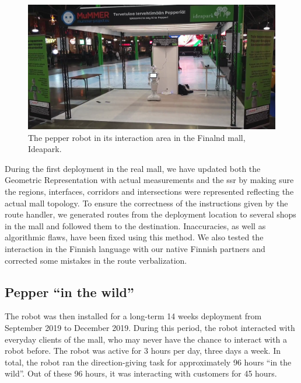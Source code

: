 \begin{figure}[ht!]
\centering
\includegraphics[scale=0.2]{figures/chapter8/pepper_mall.png}
\caption{\label{fig:chap8_pepper_mall} The pepper robot in its interaction area in the Finalnd mall, Ideapark. }
\end{figure}

During the first deployment in the real mall, we have updated both the Geometric Representation with actual measurements and the \acrfull{ssr} by making sure the regions, interfaces, corridors and intersections were represented reflecting the actual mall topology. To ensure the correctness of the instructions given by the route handler, we generated routes from the deployment location to several shops in the mall and followed them to the destination. Inaccuracies, as well as algorithmic flaws, have been fixed using this method. We also tested the interaction in the Finnish language with our native Finnish partners and corrected some mistakes in the route verbalization.

\subsection{Pepper ``in the wild''}

The robot was then installed for a long-term 14 weeks deployment from September 2019 to December 2019. During this period, the robot interacted with everyday clients of the mall, who may never have the chance to interact with a robot before. The robot was active for 3 hours per day, three days a week. In total, the robot ran the direction-giving task for approximately 96 hours ``in the wild''. Out of these 96 hours, it was interacting with customers for 45 hours.
